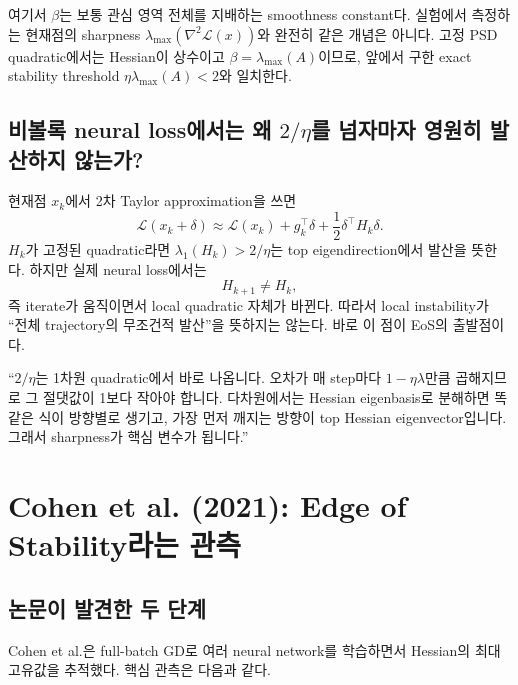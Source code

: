 \documentclass[11pt,a4paper,oneside,openany]{memoir}
\newcommand{\Loss}{\mathcal{L}}
\newcommand{\Hess}{\nabla^2}
\theoremstyle{definition}
\begin{document}
\begin{warningbox}
여기서 $\beta$는 보통 관심 영역 전체를 지배하는 smoothness constant다.
실험에서 측정하는 현재점의 sharpness $\lambda_{\max}(\Hess\Loss(x))$와 완전히 같은 개념은 아니다.
고정 PSD quadratic에서는 Hessian이 상수이고 $\beta=\lambda_{\max}(A)$이므로,
앞에서 구한 exact stability threshold $\eta\lambda_{\max}(A)<2$와 일치한다.
\end{warningbox}

\section{비볼록 neural loss에서는 왜 \texorpdfstring{$2/\eta$}{2/eta}를 넘자마자 영원히 발산하지 않는가?}

현재점 $x_k$에서 2차 Taylor approximation을 쓰면
\begin{equation}
  \Loss(x_k+\delta)
  \approx \Loss(x_k)+g_k^\top\delta+\frac12\delta^\top H_k\delta.
\end{equation}
$H_k$가 고정된 quadratic라면 $\lambda_1(H_k)>2/\eta$는 top eigendirection에서 발산을 뜻한다.
하지만 실제 neural loss에서는
\begin{equation}
  H_{k+1}\neq H_k,
\end{equation}
즉 iterate가 움직이면서 local quadratic 자체가 바뀐다.
따라서 local instability가 ``전체 trajectory의 무조건적 발산''을 뜻하지는 않는다.
바로 이 점이 EoS의 출발점이다.

\begin{presentbox}
``$2/\eta$는 1차원 quadratic에서 바로 나옵니다. 오차가 매 step마다 $1-\eta\lambda$만큼 곱해지므로
그 절댓값이 1보다 작아야 합니다. 다차원에서는 Hessian eigenbasis로 분해하면 똑같은 식이 방향별로 생기고,
가장 먼저 깨지는 방향이 top Hessian eigenvector입니다. 그래서 sharpness가 핵심 변수가 됩니다.''
\end{presentbox}

\chapter{Cohen et al. (2021): Edge of Stability라는 관측}

\section{논문이 발견한 두 단계}

Cohen et al.은 full-batch GD로 여러 neural network를 학습하면서 Hessian의 최대 고유값을 추적했다.
핵심 관측은 다음과 같다.
\end{document}
